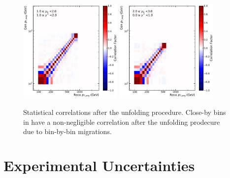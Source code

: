 \begin{figure}[htbp]
    \includegraphics[width=0.45\textwidth]{figures/measurement/unf_nlo_corr_yb1ys1.pdf}\hfill
    \includegraphics[width=0.45\textwidth]{figures/measurement/unf_nlo_corr_yb2ys0.pdf}
    \caption{Statistical correlations after the unfolding procedure. Close-by bins in \ptavg
    have a non-negligible correlation after the unfolding prodecure due to bin-by-bin migrations.}
    \label{fig:corr_unfolding_nlo}
\end{figure}

\section{Experimental Uncertainties}


